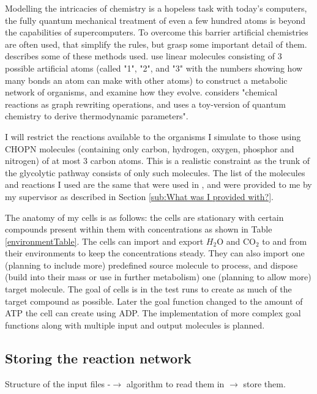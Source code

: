 \documentclass[10pt,a4paper]{article}
\begin{document}
	Modelling the intricacies of chemistry is a hopeless task with today's computers, the fully quantum mechanical treatment of even a few hundred atoms is beyond the capabilities of supercomputers. To overcome this barrier artificial chemistries are often used, that simplify the rules, but grasp some important detail of them. \citeauthor{artificialreview} describes some of these methods used. \citeauthor{evolutioncomplex} use linear molecules consisting of 3 possible  artificial atoms (called "1", "2", and "3" with the numbers showing how many bonds an atom can make with other atoms) to construct a metabolic network of organisms, and examine how they evolve. \citeauthor{computationalframework} considers "chemical reactions as graph rewriting operations, and uses a toy-version of quantum chemistry to derive thermodynamic parameters". 
	
	I will restrict the reactions available to the organisms I simulate to those using CHOPN molecules (containing only carbon, hydrogen, oxygen, phosphor and nitrogen) of at most 3 carbon atoms. This is a realistic constraint as the trunk of the glycolytic pathway consists of only such molecules. The list of the molecules and reactions I used are the same that were used in \citeauthor{BartekLower}, and were provided to me by my supervisor as described in Section \ref{sub:What was I provided with?}. 
	
	The anatomy of my cells is as follows: the cells are stationary with certain compounds present within them with concentrations as shown in Table \ref{environmentTable}. The cells can import and export $H_2$O and CO$_2$ to and from their environments to keep the concentrations steady. They can also import one (planning to include more) predefined source molecule to process, and dispose (build into their mass or use in further metabolism) one (planning to allow more) target molecule. The goal of cells is in the test runs to create as much of the target compound as possible. Later the goal function changed to the amount of ATP the cell can create using ADP. The implementation of more complex goal functions along with multiple input and output molecules is planned. 
	
\subsection{Storing the reaction network}
\label{sub:Storing the reaction network}
Structure of the input files -$\rightarrow$ algorithm to read them in $\rightarrow$ store them. 
\end{document}
